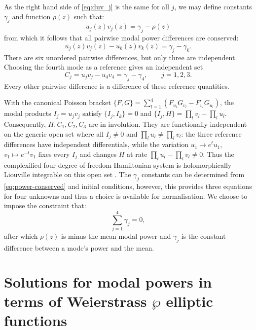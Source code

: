 \documentclass[11pt,a4paper]{article}
\numberwithin{equation}{section}
\begin{document}
As the right hand side of \eqref{eq:duv_j} is the same for all $j$,
we may define constants $\gamma_j$ and function $\rho(z)$ such that:
\begin{equation}
\label{eq:uvj-gam-rho}
u_j(z) v_j(z) = \gamma_j - \rho(z)
\end{equation}
from which it follows that all pairwise modal power differences are conserved:
\begin{equation}
\label{eq:power-conserved}
u_j(z) v_j(z) - u_k(z) v_k(z) = \gamma_j - \gamma_k.
\end{equation}
There are six unordered pairwise differences, but only three are independent.
Choosing the fourth mode as a reference gives an independent set
\begin{equation}
C_j=u_jv_j-u_4v_4=\gamma_j-\gamma_4,\qquad j=1,2,3.
\label{eq:independent-power-conserved}
\end{equation}
Every other pairwise difference is a difference of these reference quantities.

With the canonical Poisson bracket
$\{F,G\}=\sum_{l=1}^{4}(F_{u_l}G_{v_l}-F_{v_l}G_{u_l})$,
the modal products $I_j=u_jv_j$ satisfy $\{I_j,I_k\}=0$ and
$\{I_j,H\}=\prod_l v_l-\prod_l u_l$.
Consequently, $H,C_1,C_2,C_3$ are in involution.
They are functionally independent on the generic open set where all $I_j\ne0$ and $\prod_l u_l\ne\prod_l v_l$:
the three reference differences have independent differentials, while the variation
$u_1\mapsto e^t u_1$, $v_1\mapsto e^{-t}v_1$ fixes every $I_j$ and changes $H$ at rate $\prod_l u_l-\prod_l v_l\ne0$.
Thus the complexified four-degree-of-freedom Hamiltonian system is holomorphically Liouville integrable on this open set \cite{arnoldMathematicalMethodsClassical1989}.
The $\gamma_j$ constants can be determined from \eqref{eq:power-conserved} and initial conditions,
however, this provides three equations for four unknowns and thus a choice is available for normalisation.
We choose to impose the constraint that:
\begin{equation}
\sum\limits_{j=1}^{4}\gamma_j = 0,
\end{equation}
after which $\rho(z)$ is minus the mean modal power and $\gamma_j$ is the constant difference between a mode's power and the mean.



\section{Solutions for modal powers in terms of Weierstrass \texorpdfstring{$\wp$}{wp} elliptic functions}\label{sec:mode-power}
\end{document}
